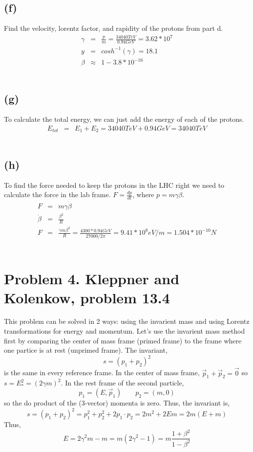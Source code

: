 \documentclass[11pt]{amsart}
\begin{document}
\subsection*{(f)} Find the velocity, lorentz factor, and rapidity of the protons from part d. \\
\begin{eqnarray*}
\gamma &=& \frac{p}{m} = \frac{34040TeV}{0.94GeV} = 3.62*10^{7} \\
y &=& cosh^{-1}(\gamma) = 18.1 \\
\beta &\approx& 1-3.8*10^{-16} 
\end{eqnarray*} \\
\subsection*{(g)} To calculate the total energy, we can just add the energy of each of the protons. \\
\begin{eqnarray*}
E_{tot} &=& E_{1}+E_{2} = 34040TeV+0.94GeV = 34040TeV
\end{eqnarray*} \\
\subsection*{(h)} To find the force needed to keep the protons in the LHC right we need to calculate the force in the lab frame. $F=\frac{dp}{dt}$, where $p=m\gamma\beta$. \\
\begin{eqnarray*} 
F &=& m\gamma\dot{\beta} \\
\dot{\beta} &=& \frac{\beta^{2}}{R} \\
F &=& \frac{\gamma{m}\beta^{2}}{R}  = \frac{4300*0.94GeV}{27000/2\pi} = 9.41*10^{8}eV/m  = 1.504*10^{-10} N
\end{eqnarray*} \\

\section*{Problem 4. Kleppner and Kolenkow, problem 13.4}

This problem can be solved in 2 ways: using the invarient mass and using Lorentz transformations for energy and momentum. Let's use the invarient mass method first by comparing the center of mass frame (primed frame) to the frame where one partice is at rest (unprimed frame). The invariant,
\[s = (p_1 + p_2)^2\]
is the same in every reference frame. In the center of mass frame, $\vec{p}_1 + \vec{p}_2 = \vec{0}$ so $s = E_*^2 = (2 \gamma m)^2$. In the rest frame of the second particle,
\[p_1 = (E, \vec{p}_1) \quad \quad p_2 = (m, 0)\]
so the do product of the (3-vector) momenta is zero. Thus, the invariant is,
\[s = (p_1 + p_2)^2 = p_1^2 + p_2^2 + 2 p_1 \cdot p_2 = 2 m^2 + 2 E m = 2m (E + m)\]
Thus,
\[E = 2 \gamma^2 m - m = m ( 2 \gamma^2 - 1) = m \frac{1 + \beta^2}{1 - \beta^2}\]
\end{document}

